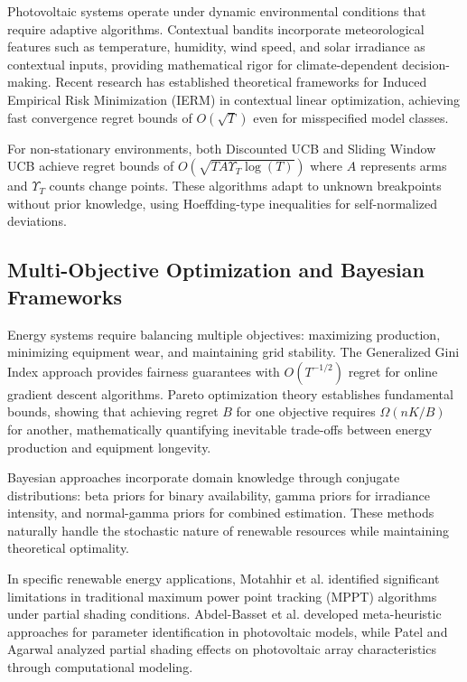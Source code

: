 \documentclass[conference]{IEEEtran}
\begin{document}
Photovoltaic systems operate under dynamic environmental conditions that require adaptive algorithms. Contextual bandits incorporate meteorological features such as temperature, humidity, wind speed, and solar irradiance as contextual inputs, providing mathematical rigor for climate-dependent decision-making. Recent research has established theoretical frameworks for Induced Empirical Risk Minimization (IERM) in contextual linear optimization, achieving fast convergence regret bounds of $O(\sqrt{T})$ even for misspecified model classes.

For non-stationary environments, both Discounted UCB and Sliding Window UCB achieve regret bounds of $O(\sqrt{TA\Upsilon_T \log(T)})$ where $A$ represents arms and $\Upsilon_T$ counts change points. These algorithms adapt to unknown breakpoints without prior knowledge, using Hoeffding-type inequalities for self-normalized deviations.

\subsection{Multi-Objective Optimization and Bayesian Frameworks}

Energy systems require balancing multiple objectives: maximizing production, minimizing equipment wear, and maintaining grid stability. The Generalized Gini Index approach provides fairness guarantees with $O(T^{-1/2})$ regret for online gradient descent algorithms. Pareto optimization theory establishes fundamental bounds, showing that achieving regret $B$ for one objective requires $\Omega(nK/B)$ for another, mathematically quantifying inevitable trade-offs between energy production and equipment longevity.

Bayesian approaches incorporate domain knowledge through conjugate distributions: beta priors for binary availability, gamma priors for irradiance intensity, and normal-gamma priors for combined estimation. These methods naturally handle the stochastic nature of renewable resources while maintaining theoretical optimality.

In specific renewable energy applications, Motahhir et al. \cite{motahhir2020} identified significant limitations in traditional maximum power point tracking (MPPT) algorithms under partial shading conditions. Abdel-Basset et al. \cite{abdel2021} developed meta-heuristic approaches for parameter identification in photovoltaic models, while Patel and Agarwal \cite{patel2020} analyzed partial shading effects on photovoltaic array characteristics through computational modeling.
\end{document}
